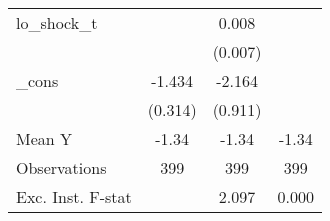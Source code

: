 {\begin{tabular}{l*{3}{c}}
\addlinespace
lo\_shock\_t  &                     &       0.008         &                     \\
            &                     &     (0.007)         &                     \\
\addlinespace
\_cons      &      -1.434\sym{***}&      -2.164\sym{**} &                     \\
            &     (0.314)         &     (0.911)         &                     \\
\midrule
Mean Y      &       -1.34         &       -1.34         &       -1.34         \\
Observations&         399         &         399         &         399         \\
Exc. Inst. F-stat&                     &       2.097         &       0.000         \\
\bottomrule
\end{tabular}
}
